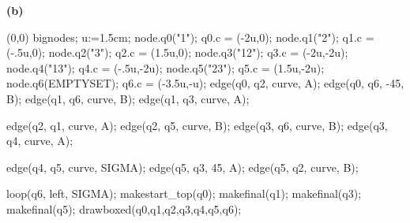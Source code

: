 \documentclass{article}
\begin{document}
\begin{empfile}
\textbf{(b)}

	\begin{center}
	\begin{emp}(0,0)
	bignodes;
	u:=1.5cm;
	node.q0("1"); q0.c = (-2u,0);
	node.q1("2"); q1.c = (-.5u,0);
	node.q2("3"); q2.c = (1.5u,0);
	node.q3("12"); q3.c = (-2u,-2u);
	node.q4("13"); q4.c = (-.5u,-2u);
	node.q5("23"); q5.c = (1.5u,-2u);
	node.q6(EMPTYSET); q6.c = (-3.5u,-u);
	edge(q0, q2, curve, A);
	edge(q0, q6, -45, B);
	edge(q1, q6, curve, B);
	edge(q1, q3, curve, A);
	
	edge(q2, q1, curve, A);
	edge(q2, q5, curve, B);
	edge(q3, q6, curve, B);
	edge(q3, q4, curve, A);
	
	edge(q4, q5, curve, SIGMA);
	edge(q5, q3, 45, A);
	edge(q5, q2, curve, B);

	loop(q6, left, SIGMA);
	makestart_top(q0);
	makefinal(q1);
	makefinal(q3);
	makefinal(q5);
	drawboxed(q0,q1,q2,q3,q4,q5,q6);
	\end{emp}
	\end{center}
	
\end{empfile}
\immediate{}
\end{document}
